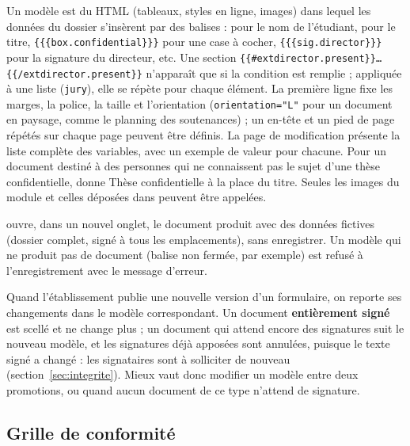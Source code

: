 \documentclass[11pt,a4paper]{article}
\begin{document}
Un modèle est du HTML (tableaux, styles en ligne, images) dans lequel les
données du dossier s'insèrent par des balises :  pour le
nom de l'étudiant,  pour le titre,
\texttt{\{\{\{box.confidential\}\}\}} pour une case à cocher,
\texttt{\{\{\{sig.director\}\}\}} pour la signature du directeur, etc. Une
section \texttt{\{\{\#extdirector.present\}\}\ldots\{\{/extdirector.present\}\}}
n'apparaît que si la condition est remplie ; appliquée à une liste
(\texttt{jury}), elle se répète pour chaque élément. La première ligne fixe les
marges, la police, la taille et l'orientation (\texttt{orientation="L"} pour un
document en paysage, comme le planning des soutenances) ; un en-tête et un pied
de page répétés sur chaque page peuvent être définis. La page de modification
présente la liste complète des variables, avec un exemple de valeur pour
chacune. Pour un document destiné à des personnes qui ne connaissent pas le
sujet d'une thèse confidentielle,  donne \og Thèse
confidentielle\fg{} à la place du titre. Seules les images du module et celles
déposées dans  peuvent être appelées.


 ouvre, dans un nouvel onglet, le document produit avec des
données fictives (dossier complet, signé à tous les emplacements), sans
enregistrer. Un modèle qui ne produit pas de document (balise non fermée, par
exemple) est refusé à l'enregistrement avec le message d'erreur.

\begin{attention}
Quand l'établissement publie une nouvelle version d'un formulaire, on reporte
ses changements dans le modèle correspondant. Un document \textbf{entièrement
signé} est scellé et ne change plus ; un document qui attend encore des
signatures suit le nouveau modèle, et les signatures déjà apposées sont
annulées, puisque le texte signé a changé : les signataires sont à solliciter
de nouveau (section~\ref{sec:integrite}). Mieux vaut donc modifier un modèle
entre deux promotions, ou quand aucun document de ce type n'attend de
signature.
\end{attention}

\subsection{Grille de conformité}\label{sec:grille}
\end{document}
